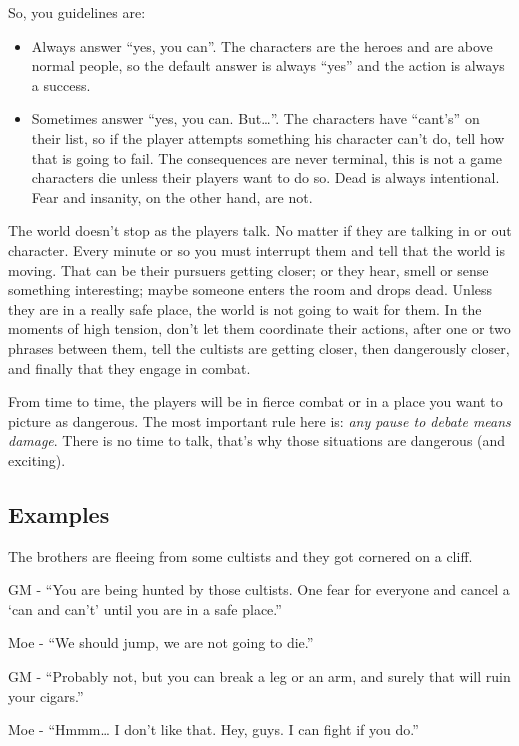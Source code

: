 \documentclass[11pt]{article}
\begin{document}
So, you guidelines are:
\begin{itemize}
\item Always answer \enquote{yes, you can}. The characters are the heroes and are above normal people, so the default answer is always \enquote{yes} and the action is always a success.
\item Sometimes answer \enquote{yes, you can. But\ldots{}}. The characters have \enquote{cant's} on their list, so if the player attempts something his character can't do, tell how that is going to fail. The consequences are never terminal, this is not a game characters die unless their players want to do so. Dead is always intentional. Fear and insanity, on the other hand, are not.
\end{itemize}

The world doesn't stop as the players talk. No matter if they are talking in or out character. Every minute or so you must interrupt them and tell that the world is moving. That can be their pursuers getting closer; or they hear, smell or sense something interesting; maybe someone enters the room and drops dead. Unless they are in a really safe place, the world is not going to wait for them. In the moments of high tension, don't let them coordinate their actions, after one or two phrases between them, tell the cultists are getting closer, then dangerously closer, and finally that they engage in combat.

From time to time, the players will be in fierce combat or in a place you want to picture as dangerous. The most important rule here is: \textit{any pause to debate means damage}. There is no time to talk, that's why those situations are dangerous (and exciting).

\subsection{Examples}
\label{sec:orgcef5c31}
The brothers are fleeing from some cultists and they got cornered on a cliff.

GM - \enquote{You are being hunted by those cultists. One fear for everyone and cancel a \enquote{can and can't} until you are in a safe place.}

Moe - \enquote{We should jump, we are not going to die.}

GM - \enquote{Probably not, but you can break a leg or an arm, and surely that will ruin your cigars.}

Moe - \enquote{Hmmm\ldots{} I don't like that. Hey, guys. I can fight if you do.}
\end{document}
